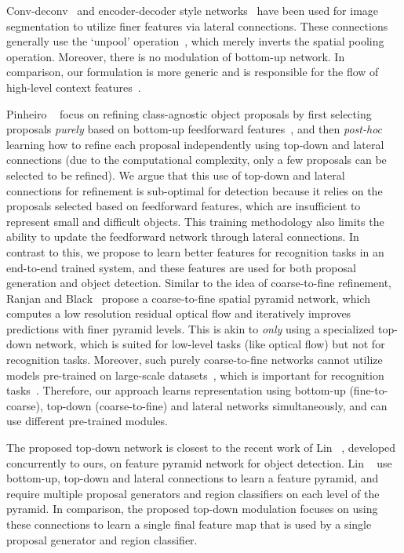 \documentclass[10pt,twocolumn,letterpaper]{article}
\begin{document}
Conv-deconv~\cite{noh2015learning} and encoder-decoder style networks~\cite{badrinarayanan2015segnet,ronneberger2015unet} have been used for image segmentation to utilize finer features via lateral connections. These connections generally use the `unpool' operation~\cite{zeiler2010deconvolutional}, which merely inverts the spatial pooling operation. Moreover, there is no modulation of bottom-up network. In comparison, our formulation is more generic and is responsible for the flow of high-level context features~\cite{piech2013network}.

Pinheiro \etal~\cite{pinheiro2016learning} focus on refining class-agnostic object proposals by first selecting proposals \emph{purely} based on bottom-up feedforward features~\cite{pinheiro2015learning}, and then \emph{post-hoc} learning how to refine each proposal independently using top-down and lateral connections (due to the computational complexity, only a few proposals can be selected to be refined). We argue that this use of top-down and lateral connections for refinement is sub-optimal for detection because it relies on the proposals selected based on feedforward features, which are insufficient to represent small and difficult objects. This training methodology also limits the ability to update the feedforward network through lateral connections. In contrast to this, we propose to learn better features for recognition tasks in an end-to-end trained system, and these features are used for both proposal generation and object detection. Similar to the idea of coarse-to-fine refinement, Ranjan and Black~\cite{ranjan2016optical} propose a coarse-to-fine spatial pyramid network, 
which computes a low resolution residual optical flow and iteratively improves predictions with finer pyramid levels. 
This is akin to \emph{only} using a specialized top-down network, which is suited for low-level tasks (like optical flow) but not for recognition tasks. 
Moreover, such purely coarse-to-fine networks cannot utilize models pre-trained on large-scale datasets~\cite{imagenet}, which is important for recognition tasks~\cite{rcnn}.
Therefore, our approach learns representation using bottom-up (fine-to-coarse), top-down (coarse-to-fine) and lateral networks simultaneously, and can use different pre-trained modules.

The proposed top-down network is closest to the recent work of Lin \etal~\cite{lin2016feature}, developed concurrently to ours, on feature pyramid network for object detection. Lin \etal~\cite{lin2016feature} use bottom-up, top-down and lateral connections to learn a feature pyramid, and require multiple proposal generators and region classifiers on each level of the pyramid. In comparison, the proposed top-down modulation focuses on using these connections to learn a single final feature map that is used by a single proposal generator and region classifier.
\end{document}
